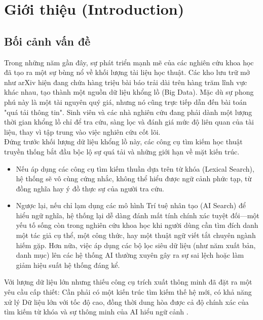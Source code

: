 \chapter{Giới thiệu (Introduction)}

\section{Bối cảnh vấn đề}
Trong những năm gần đây, sự phát triển mạnh mẽ của các nghiên cứu khoa học đã tạo ra một sự bùng nổ về khối lượng tài liệu học thuật. Các kho lưu trữ mở như arXiv hiện đang chứa hàng triệu bài báo trải dài trên hàng trăm lĩnh vực khác nhau, tạo thành một nguồn dữ liệu khổng lồ (Big Data). Mặc dù sự phong phú này là một tài nguyên quý giá, nhưng nó cũng trực tiếp dẫn đến bài toán "quá tải thông tin". Sinh viên và các nhà nghiên cứu đang phải dành một lượng thời gian khổng lồ chỉ để tra cứu, sàng lọc và đánh giá mức độ liên quan của tài liệu, thay vì tập trung vào việc nghiên cứu cốt lõi.\\
Đứng trước khối lượng dữ liệu khổng lồ này, các công cụ tìm kiếm học thuật truyền thống bắt đầu bộc lộ sự quá tải và những giới hạn về mặt kiến trúc.\\
\begin{itemize}
    \item Nếu áp dụng các công cụ tìm kiếm thuần dựa trên từ khóa (Lexical Search), hệ thống sẽ vô cùng cứng nhắc, không thể hiểu được ngữ cảnh phức tạp, từ đồng nghĩa hay ý đồ thực sự của người tra cứu.
    \item Ngược lại, nếu chỉ lạm dụng các mô hình Trí tuệ nhân tạo (AI Search) để hiểu ngữ nghĩa, hệ thống lại dễ dàng đánh mất tính chính xác tuyệt đối—một yếu tố sống còn trong nghiên cứu khoa học khi người dùng cần tìm đích danh một tác giả cụ thể, một công thức, hay một thuật ngữ viết tắt chuyên ngành hiếm gặp. Hơn nữa, việc áp dụng các bộ lọc siêu dữ liệu (như năm xuất bản, danh mục) lên các hệ thống AI thường xuyên gây ra sự sai lệch hoặc làm giảm hiệu suất hệ thống đáng kể.
\end{itemize}
Với lượng dữ liệu lớn nhưng thiếu công cụ trích xuất thông minh đã đặt ra một yêu cầu cấp thiết: Cần phải có một kiến trúc tìm kiếm thế hệ mới, có khả năng xử lý Dữ liệu lớn với tốc độ cao, đồng thời dung hòa được cả độ chính xác của tìm kiếm từ khóa và sự thông minh của AI hiểu ngữ cảnh \cite{manning2008ir}.
